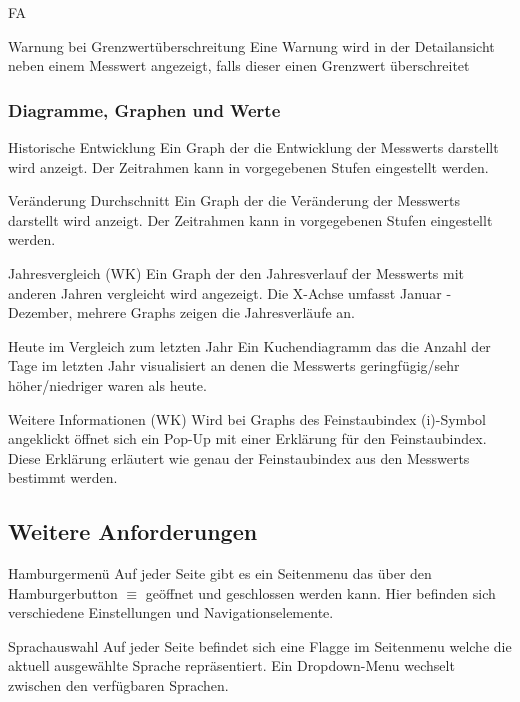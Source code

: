 \begin{Kriterien}{FA}
 \item[Warnung bei Grenzwertüberschreitung]
  Eine Warnung wird in der Detailansicht neben einem \gls{Messwert} angezeigt, falls dieser einen Grenzwert überschreitet

 \subsubsection*{Diagramme, Graphen und Werte}

 \item[Historische Entwicklung]
   Ein \gls{Graph} der die Entwicklung der \glspl{Messwert} darstellt wird anzeigt.
   Der Zeitrahmen kann in vorgegebenen Stufen eingestellt werden.
 
 \item[Veränderung Durchschnitt]
   Ein Graph der die Veränderung der \glspl{Messwert} darstellt wird anzeigt.
   Der Zeitrahmen kann in vorgegebenen Stufen eingestellt werden.

 \item[Jahresvergleich (WK)]
   Ein Graph der den Jahresverlauf der \glspl{Messwert} mit anderen Jahren vergleicht wird angezeigt.
   Die X-Achse umfasst Januar - Dezember, mehrere \glspl{Graph} zeigen die Jahresverläufe an.

 \item[Heute im Vergleich zum letzten Jahr]
   Ein \gls{Kuchendiagramm} das die Anzahl der Tage im letzten Jahr visualisiert an denen die \glspl{Messwert} geringfügig/sehr höher/niedriger waren als heute.

 \item[Weitere Informationen (WK)]
   Wird bei \glspl{Graph} des \gls{Feinstaubindex} (i)-Symbol angeklickt öffnet sich ein \gls{Pop-Up} mit einer Erklärung für den \gls{Feinstaubindex}.
   Diese Erklärung erläutert wie genau der \gls{Feinstaubindex} aus den \glspl{Messwert} bestimmt werden.

\subsection{Weitere Anforderungen}

 \item[Hamburgermenü]
  Auf jeder Seite gibt es ein \gls{Seitenmenu} das über den Hamburgerbutton $\equiv$ geöffnet und geschlossen werden kann.
  Hier befinden sich verschiedene Einstellungen und Navigationselemente.

 \item[Sprachauswahl]
   Auf jeder Seite befindet sich eine Flagge im \gls{Seitenmenu} welche die aktuell ausgewählte Sprache repräsentiert.
   Ein \gls{Dropdown-Menu} wechselt zwischen den verfügbaren Sprachen.


\end{Kriterien}
